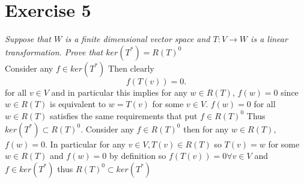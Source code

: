 \documentclass{article}
\begin{document}
    \section{Exercise 5}
    \emph{
        Suppose that $W$ is a finite dimensional vector space and $T: V \rightarrow W$ is a linear
    transformation. Prove that $ker(T^{*}) = R(T)^{0}$
    }\\
    Consider any $f \in ker(T^{*})$ Then clearly
    \[
    f(T(v)) = 0
    .\] 
    for all $v \in V$ and in particular this implies for any  $w \in R(T)$, $f(w) = 0$ since  $w \in R(T)$ is equivalent to
    $w = T(v)$ for some $v \in V$.  $f(w) = 0$ for all $w \in R(T)$ satisfies the same requirements that put $f \in R(T)^{0}$ 
    Thus $ker(T^{*}) \subset R(T)^{0}$.
    Consider any $f \in R(T)^{0}$ then for any $w \in R(T)$, $f(w) = 0$. In particular for any $v \in V, T(v) \in R(T)$  so $T(v) = w$ for some $w \in R(T)$ and $f(w) = 0$ by definition
    so $f(T(v)) = 0 \forall v \in V$ and  $f \in ker(T^{*})$ thus $R(T)^{0} \subset ker(T^{*})$ 
\end{document}
